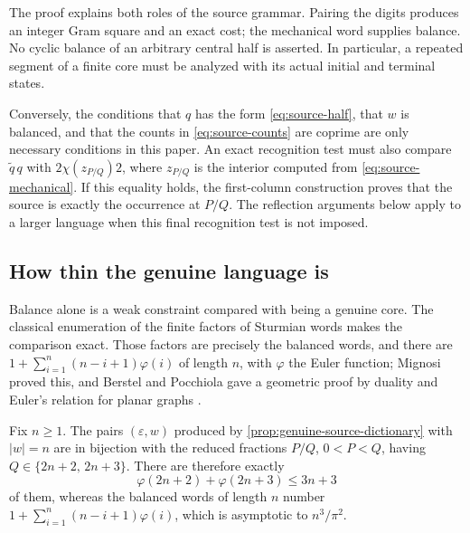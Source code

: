 The proof explains both roles of the source grammar. Pairing the digits
produces an integer Gram square and an exact cost; the mechanical word
supplies balance. No cyclic balance of an arbitrary central half is
asserted. In particular, a repeated segment of a finite core must be
analyzed with its actual initial and terminal states.

Conversely, the conditions that $q$ has the form
\eqref{eq:source-half}, that $w$ is balanced, and that the counts in
\eqref{eq:source-counts} are coprime are only necessary conditions in
this paper. An exact recognition test must also compare
$\widetilde q\,q$ with $2\chi(z_{P/Q})2$, where $z_{P/Q}$ is the
interior computed from \eqref{eq:source-mechanical}. If this equality
holds, the first-column construction proves that the source is exactly
the occurrence at $P/Q$. The reflection arguments below apply to a
larger language when this final recognition test is not imposed.

\subsection{How thin the genuine language is}

Balance alone is a weak constraint compared with being a genuine core. The
classical enumeration of the finite factors of Sturmian words makes the
comparison exact. Those factors are precisely the balanced words, and there
are $1+\sum_{i=1}^{n}(n-i+1)\varphi(i)$ of length $n$, with $\varphi$ the
Euler function; Mignosi proved this, and Berstel and Pocchiola gave a
geometric proof by duality and Euler's relation for planar graphs
\cite{Mignosi1991,BerstelPocchiola1993}.

\begin{proposition}
\label{prop:thin-language}
Fix $n\geqslant1$. The pairs $(\varepsilon,w)$ produced by
\cref{prop:genuine-source-dictionary} with $\lvert w\rvert=n$ are in
bijection with the reduced fractions $P/Q$, $0<P<Q$, having
$Q\in\{2n+2,\,2n+3\}$. There are therefore exactly
\begin{equation}
 \varphi(2n+2)+\varphi(2n+3)\leqslant 3n+3
 \label{eq:genuine-core-count}
\end{equation}
of them, whereas the balanced words of length $n$ number
$1+\sum_{i=1}^{n}(n-i+1)\varphi(i)$, which is asymptotic to $n^3/\pi^2$.
\end{proposition}

